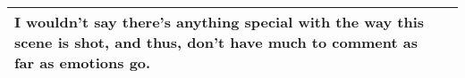 \documentclass[notitlepage]{fhnwreport}
\begin{document}
\begin{center}
\begin{threeparttable}
\begin{tabular}{p{6.8cm}p{8.2cm}}
I wouldn't say there's anything special with the way this  scene  is shot, and
thus, don't have much to comment as far as emotions go.
\\
        \bottomrule
    \end{tabular}
\end{threeparttable}
\end{center}

\printbibliography
\end{document}
